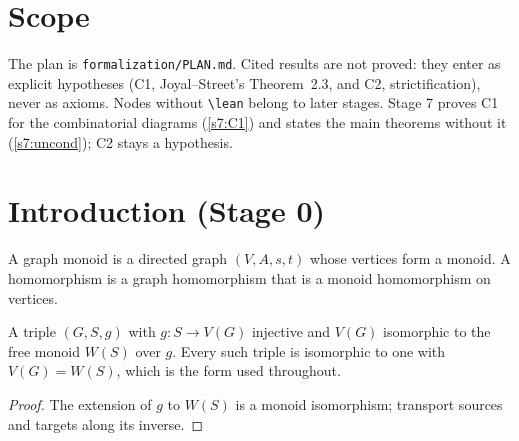 
\section{Scope}

The plan is \texttt{formalization/PLAN.md}. Cited results are not proved: they
enter as explicit hypotheses (C1, Joyal--Street's Theorem~2.3, and C2,
strictification), never as axioms. Nodes without \texttt{\textbackslash lean}
belong to later stages. Stage 7 proves C1 for the combinatorial diagrams
(\ref{s7:C1}) and states the main theorems without it (\ref{s7:uncond}); C2 stays a
hypothesis.

\section{Introduction (Stage 0)}

\begin{definition}
\label{intro:graph-monoid}
\leanok
A graph monoid is a directed graph $(V, A, s, t)$ whose vertices form a monoid.
A homomorphism is a graph homomorphism that is a monoid homomorphism on vertices.
\end{definition}

\begin{definition}
\label{intro:free-graph-monoid}
\leanok
{}
A triple $(G, S, g)$ with $g : S \to V(G)$ injective and $V(G)$ isomorphic to the
free monoid $W(S)$ over $g$. Every such triple is isomorphic to one with
$V(G) = W(S)$, which is the form used throughout.
\end{definition}

\begin{proof}
\leanok
The extension of $g$ to $W(S)$ is a monoid isomorphism; transport sources and
targets along its inverse.
\end{proof}


